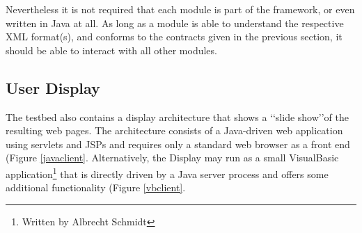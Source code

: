 \documentclass[a4paper,twoside]{danarticle}
\theoremstyle{remark}
\begin{document}
      Nevertheless it is not required that each module is part of the 
      framework, or even written in Java at all. As long as a module is able to 
      understand the respective XML format(s), and conforms to the contracts 
      given in the previous section, it should be able to interact with all 
      other modules.
    \subsection{User Display}
      The testbed also contains a display architecture that shows a \lq\lq slide
      show\rq\rq of the resulting web pages. The architecture consists of a
      Java-driven web application using servlets and JSPs and requires only a
      standard web browser as a front end (Figure \ref{javaclient}. 
      Alternatively, the Display may run as
      a small VisualBasic application\footnote{Written
      by Albrecht Schmidt} that is directly driven by a Java server
      process and offers some additional functionality (Figure \ref{vbclient}.
      
\end{document}
